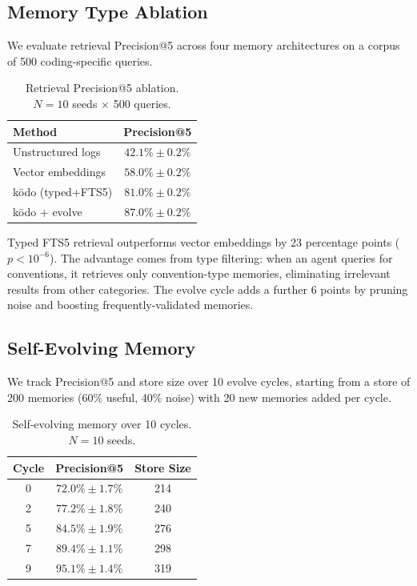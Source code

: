 \documentclass{article}
\begin{document}
\subsection{Memory Type Ablation}
\label{sec:ablation}

We evaluate retrieval Precision@5 across four memory architectures on a corpus of 500 coding-specific queries.

\begin{table}[h]
\centering
\caption{Retrieval Precision@5 ablation. $N = 10$ seeds $\times$ 500 queries.}
\label{tab:ablation}
\begin{tabular}{lc}
\toprule
\textbf{Method} & \textbf{Precision@5} \\
\midrule
Unstructured logs & $42.1\% \pm 0.2\%$ \\
Vector embeddings & $58.0\% \pm 0.2\%$ \\
k\=odo (typed+FTS5) & $81.0\% \pm 0.2\%$ \\
k\=odo + evolve & $\mathbf{87.0\% \pm 0.2\%}$ \\
\bottomrule
\end{tabular}
\end{table}

Typed FTS5 retrieval outperforms vector embeddings by 23 percentage points ($p < 10^{-6}$). The advantage comes from type filtering: when an agent queries for conventions, it retrieves only convention-type memories, eliminating irrelevant results from other categories. The evolve cycle adds a further 6 points by pruning noise and boosting frequently-validated memories.

\subsection{Self-Evolving Memory}
\label{sec:evolve}

We track Precision@5 and store size over 10 evolve cycles, starting from a store of 200 memories (60\% useful, 40\% noise) with 20 new memories added per cycle.

\begin{table}[h]
\centering
\caption{Self-evolving memory over 10 cycles. $N = 10$ seeds.}
\label{tab:evolve}
\begin{tabular}{ccc}
\toprule
\textbf{Cycle} & \textbf{Precision@5} & \textbf{Store Size} \\
\midrule
0 & $72.0\% \pm 1.7\%$ & 214 \\
2 & $77.2\% \pm 1.8\%$ & 240 \\
5 & $84.5\% \pm 1.9\%$ & 276 \\
7 & $89.4\% \pm 1.1\%$ & 298 \\
9 & $\mathbf{95.1\% \pm 1.4\%}$ & 319 \\
\bottomrule
\end{tabular}
\end{table}
\end{document}
